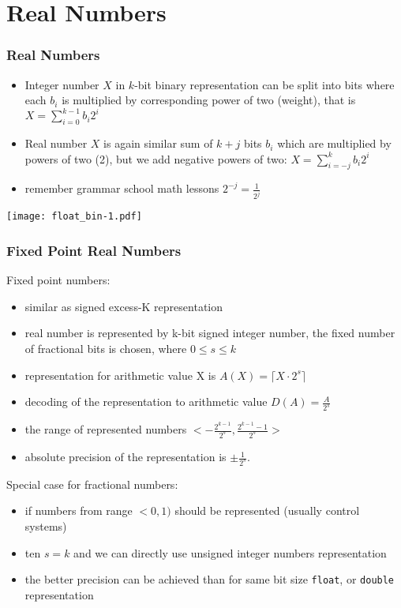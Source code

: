 \documentclass{beamer}
\begin{document}
\section{Real Numbers}


\begin{frame}
\frametitle{Real Numbers}

\begin{itemize}
\item Integer number $X$ in $k$-bit binary representation can be split into bits where each $b_i$ is multiplied by corresponding power of two (weight), that is $ X = \sum_{i=0}^{k-1} b_i 2^{i} $
\item Real number $X$ is again similar sum of $k+j$ bits $b_i$ which are multiplied by powers of two (2), but we add negative powers of two: $X = \sum_{i=-j}^{k} b_i 2^{i}$
\item remember grammar school math lessons $2^{-j} = \frac{1}{2^j}$
\end{itemize}


\begin{center}
\texttt{[image: float\_bin-1.pdf]}
\end{center}

\end{frame}


\begin{frame}
\frametitle{Fixed Point Real Numbers}

Fixed point numbers:

\begin{itemize}
\item similar as signed excess-K representation
\item real number is represented by k-bit signed integer number, the fixed number of fractional bits is chosen, where $0 \le s \le k$
\item representation for arithmetic value X is $A(X) = \lceil X \cdot 2^s \rceil$
\item decoding of the representation to arithmetic value $D(A) = \frac{A}{2^s}$
\item the range of represented numbers $<-\frac{2^{k-1}}{2^s}, \frac{2^{k-1}-1}{2^s}>$
\item absolute precision of the representation is $\pm \frac{1}{2^s}$.
\end{itemize}

 Special case for fractional numbers:
\begin{itemize}
\item if numbers from range $<0,1)$ should be represented (usually control systems)
\item ten $s=k$ and we can directly use unsigned integer numbers representation
\item the better precision can be achieved than for same bit size \texttt{float}, or \texttt{double} representation
\end{itemize}

\end{frame}
\end{document}
